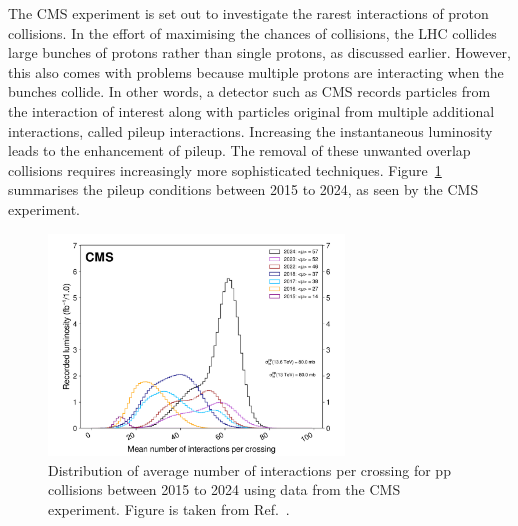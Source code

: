 The CMS experiment is set out to investigate the rarest interactions of proton collisions. In the effort of maximising the chances of collisions, the LHC collides large bunches of protons rather than single protons, as discussed earlier. However, this also comes with problems because multiple protons are interacting when the bunches collide. In other words, a detector such as CMS records particles from the interaction of interest along with particles original from multiple additional interactions, called pileup interactions. Increasing the instantaneous luminosity leads to the enhancement of pileup. The removal of these unwanted overlap collisions requires increasingly more sophisticated techniques. Figure~\ref{Figure:Chapter3_CMS_Pileup} summarises the pileup conditions between 2015 to 2024, as seen by the CMS experiment.

\begin{figure}[h]
\centering
\includegraphics[width= 0.7\textwidth]{Figures/Chapter3/CMS_Pileup.pdf}
\caption{Distribution of average number of interactions per crossing for pp collisions between 2015 to 2024 using data from the CMS experiment. Figure is taken from Ref.~\cite{CMS_IntegratedLumi}.}
\label{Figure:Chapter3_CMS_Pileup}
\end{figure}



